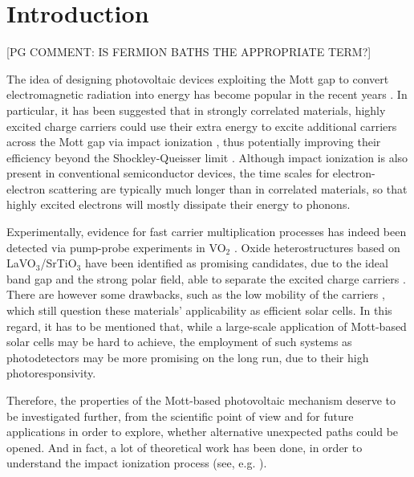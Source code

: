 \documentclass[aps,prb,groupedaddress,showpacs,twocolumn,superscriptaddress,10pt]{revtex4-2}
\newcommand{\pgcomm}[1]{{\color{ao(english)} [PG COMMENT: #1]}}
\begin{document}
\maketitle   
 

\section{Introduction} 
\label{sec:intro} 

\pgcomm{IS FERMION BATHS THE APPROPRIATE TERM?}
 
 
The idea of designing photovoltaic devices exploiting the Mott gap to convert electromagnetic radiation into energy has become popular in the recent years \cite{mano.10,li.ch.13,gu.gu.13,co.ma.14,wa.li.15}. In particular, it has been
suggested that in strongly correlated materials, highly excited charge carriers could use their extra energy to excite additional carriers across the Mott gap via impact ionization \cite{mano.10,co.ma.14}, thus
potentially improving their efficiency beyond the Shockley-Queisser limit \cite{sh.qu.61}. Although impact ionization is also present in conventional semiconductor devices, the time scales for electron-electron scattering are typically much longer than in correlated materials, so that highly excited electrons will mostly dissipate their energy to phonons. 

Experimentally, evidence for fast carrier multiplication processes has indeed been detected via pump-probe experiments in VO$_2$ \cite{ho.bi.16}. Oxide heterostructures based on LaVO$_3$/SrTiO$_3$ have been identified as promising candidates, due to the ideal band gap and the strong polar field, able to separate the excited charge carriers \cite{as.bl.13}. There are however some drawbacks, such as the low mobility of the carriers \cite{wa.li.15,je.re.18}, which still question these materials’ applicability as efficient solar cells. In this regard, it has to be mentioned that, while a large-scale application of Mott-based solar cells may be hard to achieve, the employment of such systems as photodetectors may be more promising on the long run, due to their high photoresponsivity. 

Therefore, the properties of the Mott-based photovoltaic mechanism deserve to be investigated further, from the scientific point of view and for future applications in order to explore, whether alternative unexpected paths could be opened. And in fact, a lot of theoretical work has been done, in order to understand the impact ionization process (see, e.g. \cite{co.ma.14,ec.we.11,ec.we.13,we.he.14,pe.be.19,so.do.18,ka.wo.20,ma.ev.22}). 
\end{document}
